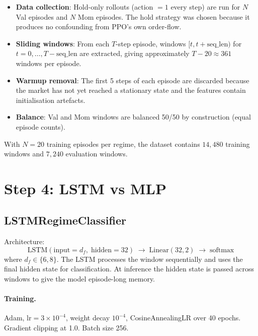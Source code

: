 \documentclass[11pt]{article}
\begin{document}
\begin{itemize}[nosep]
  \item \textbf{Data collection}: Hold-only rollouts (action $= 1$ every step)
        are run for $N$ Val episodes and $N$ Mom episodes.
        The hold strategy was chosen because it produces no confounding
        from PPO's own order-flow.
  \item \textbf{Sliding windows}: From each $T$-step episode, windows
        $[t, t + \text{seq\_len})$ for $t = 0, \ldots, T - \text{seq\_len}$
        are extracted, giving approximately $T - 20 \approx 361$ windows per
        episode.
  \item \textbf{Warmup removal}: The first 5 steps of each episode are
        discarded because the market has not yet reached a stationary
        state and the features contain initialisation artefacts.
  \item \textbf{Balance}: Val and Mom windows are balanced 50/50 by
        construction (equal episode counts).
\end{itemize}

\noindent
With $N = 20$ training episodes per regime, the dataset contains
$14{,}480$ training windows and $7{,}240$ evaluation windows.

\section{Step 4: LSTM vs MLP}

\subsection{LSTMRegimeClassifier}

Architecture:
\[
\text{LSTM}(\text{input}=d_f,\; \text{hidden}=32) \;\to\; \text{Linear}(32, 2) \;\to\; \text{softmax}
\]
where $d_f \in \{6, 8\}$.  The LSTM processes the window sequentially and
uses the final hidden state for classification.  At inference the hidden state
is passed across windows to give the model episode-long memory.

\paragraph{Training.}
Adam, lr$=3 \times 10^{-4}$, weight decay $10^{-4}$, CosineAnnealingLR over
40 epochs.  Gradient clipping at 1.0.  Batch size 256.
\end{document}
